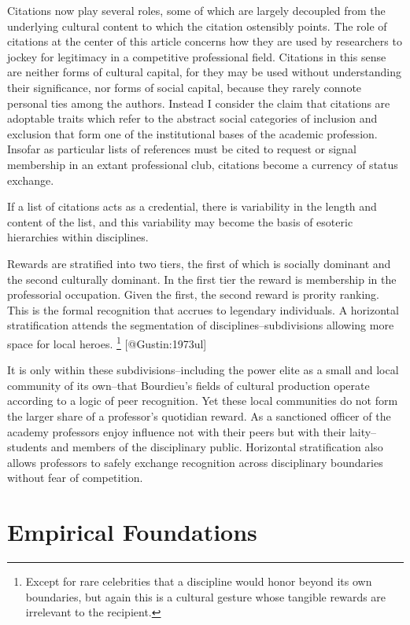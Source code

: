 \documentclass[]{article}
\let\rmarkdownfootnote\footnote%
\def\footnote{\protect\rmarkdownfootnote}
\begin{document}
Citations now play several roles, some of which are largely decoupled
from the underlying cultural content to which the citation ostensibly
points. The role of citations at the center of this article concerns how
they are used by researchers to jockey for legitimacy in a competitive
professional field. Citations in this sense are neither forms of
cultural capital, for they may be used without understanding their
significance, nor forms of social capital, because they rarely connote
personal ties among the authors. Instead I consider the claim that
citations are adoptable traits which refer to the abstract social
categories of inclusion and exclusion that form one of the institutional
bases of the academic profession. Insofar as particular lists of
references must be cited to request or signal membership in an extant
professional club, citations become a currency of status exchange.

If a list of citations acts as a credential, there is variability in the
length and content of the list, and this variability may become the
basis of esoteric hierarchies within disciplines.

Rewards are stratified into two tiers, the first of which is socially
dominant and the second culturally dominant. In the first tier the
reward is membership in the professorial occupation. Given the first,
the second reward is prority ranking. This is the formal recognition
that accrues to legendary individuals. A horizontal stratification
attends the segmentation of disciplines--subdivisions allowing more
space for local heroes. \footnote{Except for rare celebrities that a
  discipline would honor beyond its own boundaries, but again this is a
  cultural gesture whose tangible rewards are irrelevant to the
  recipient.} {[}@Gustin:1973ul{]}

It is only within these subdivisions--including the power elite as a
small and local community of its own--that Bourdieu's fields of cultural
production operate according to a logic of peer recognition. Yet these
local communities do not form the larger share of a professor's
quotidian reward. As a sanctioned officer of the academy professors
enjoy influence not with their peers but with their laity--students and
members of the disciplinary public. Horizontal stratification also
allows professors to safely exchange recognition across disciplinary
boundaries without fear of competition.

\section{Empirical Foundations}\label{empirical-foundations}
\end{document}

